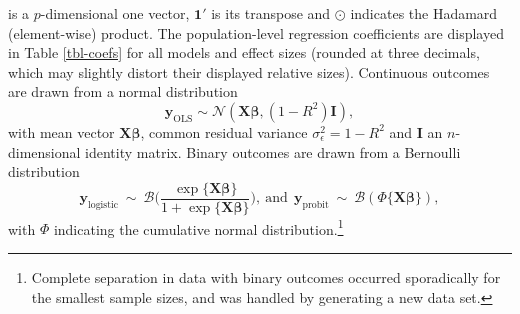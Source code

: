 \documentclass[
]{interact}
\begin{document}
is a \(p\)-dimensional one vector, \(\boldsymbol{1'}\) is its transpose
                    and \(\odot\) indicates the Hadamard (element-wise) product. The
                    population-level regression coefficients are displayed in Table
                    \ref{tbl-coefs} for all models and effect sizes (rounded at three
                                                                     decimals, which may slightly distort their displayed relative sizes).
                    Continuous outcomes are drawn from a normal distribution \[
                      \boldsymbol{y}_{\text{OLS}} \sim \mathcal{N}(\boldsymbol{X\beta}, (1 - R^2)\boldsymbol{I}),
                      \] with mean vector \(\boldsymbol{X\beta}\), common residual variance
                    \(\sigma_{\epsilon}^2=1-R^2\) and \(\boldsymbol{I}\) an
                    \(n\)-dimensional identity matrix. Binary outcomes are drawn from a
                    Bernoulli distribution \[
                      \boldsymbol{y}_{\text{logistic}} ~ \sim ~ \mathcal{B}\Big(\frac{\exp\{\boldsymbol{X\beta}\}}{1 + \exp\{\boldsymbol{X\beta}\}}\Big), 
                      ~ \text{and} ~~
                        \boldsymbol{y}_{\text{probit}} ~ \sim ~ \mathcal{B}(\Phi\{\boldsymbol{X\beta}\}),
                      \] with \(\Phi\) indicating the cumulative normal
                    distribution.\footnote{Complete separation in data with binary outcomes
                      occurred sporadically for the smallest sample sizes, and was handled
                      by generating a new data set.}
                    
\end{document}

